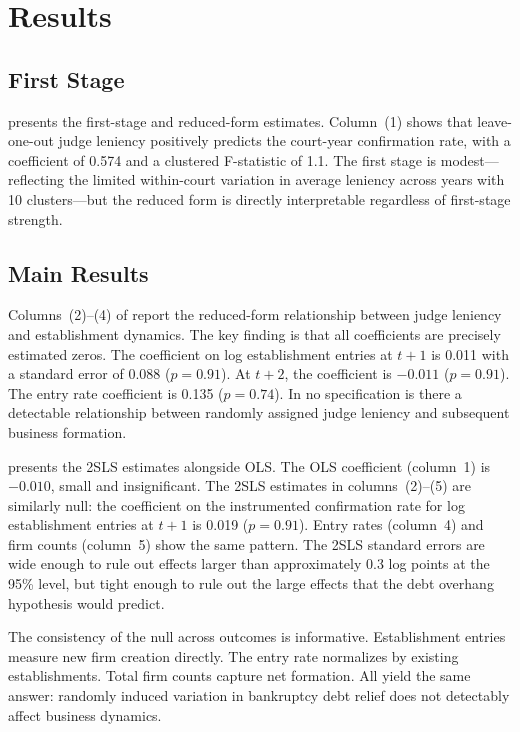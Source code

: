 \documentclass[12pt]{article}
\begin{document}
\section{Results}
\label{sec:results}

\subsection{First Stage}



 presents the first-stage and reduced-form estimates. Column~(1) shows that leave-one-out judge leniency positively predicts the court-year confirmation rate, with a coefficient of 0.574 and a clustered F-statistic of 1.1. The first stage is modest---reflecting the limited within-court variation in average leniency across years with 10 clusters---but the reduced form is directly interpretable regardless of first-stage strength.

\subsection{Main Results}

Columns~(2)--(4) of  report the reduced-form relationship between judge leniency and establishment dynamics. The key finding is that all coefficients are precisely estimated zeros. The coefficient on log establishment entries at $t+1$ is 0.011 with a standard error of 0.088 ($p=0.91$). At $t+2$, the coefficient is $-0.011$ ($p=0.91$). The entry rate coefficient is 0.135 ($p=0.74$). In no specification is there a detectable relationship between randomly assigned judge leniency and subsequent business formation.



 presents the 2SLS estimates alongside OLS. The OLS coefficient (column~1) is $-0.010$, small and insignificant. The 2SLS estimates in columns~(2)--(5) are similarly null: the coefficient on the instrumented confirmation rate for log establishment entries at $t+1$ is 0.019 ($p=0.91$). Entry rates (column~4) and firm counts (column~5) show the same pattern. The 2SLS standard errors are wide enough to rule out effects larger than approximately 0.3 log points at the 95\% level, but tight enough to rule out the large effects that the debt overhang hypothesis would predict.

The consistency of the null across outcomes is informative. Establishment entries measure new firm creation directly. The entry rate normalizes by existing establishments. Total firm counts capture net formation. All yield the same answer: randomly induced variation in bankruptcy debt relief does not detectably affect business dynamics.
\end{document}

